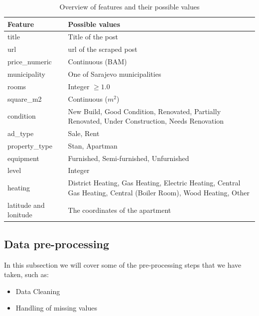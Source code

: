 \documentclass[11pt]{article}
\begin{document}
			\begin{table}[H]
				\centering

				\begin{tabularx}{\textwidth}{|l|X|}
					\toprule
					\textbf{Feature} & \textbf{Possible values} \\
					\midrule
						title & Title of the post \\
						url & url of the scraped post \\
						price\_numeric  & Continuous (BAM) \\
						municipality   & One of Sarajevo municipalities \\
						rooms           & Integer $\geq 1.0$ \\
						square\_m2      & Continuous ($m^2$) \\
						condition      & New Build, Good Condition, Renovated, Partially Renovated, Under Construction, Needs Renovation\\
						ad\_type        & Sale, Rent \\
						property\_type & Stan, Apartman \\
						equipment      & Furnished, Semi-furnished, Unfurnished \\
						level & Integer \\
						heating & District Heating, Gas Heating, Electric Heating, Central Gas Heating, Central (Boiler Room), Wood Heating, Other \\
						latitude and lonitude & The coordinates of the apartment \\
					\bottomrule
				\end{tabularx}

				\caption{Overview of features and their possible values}
				\label{tab:feature_domains}
			\end{table}


		\subsection{Data pre-processing}
		\label{subsec: Data pre-processing}

			In this subsection we will cover some of the pre-processing steps that we have taken, such as:
			\begin{itemize}
				\item Data Cleaning
				\item Handling of missing values
			\end{itemize}
\end{document}
